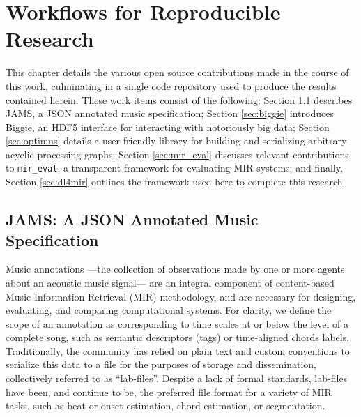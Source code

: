 

\graphicspath{{7/figures/}}

\chapter{Workflows for Reproducible Research}
\label{chp:reproducibility}

This chapter details the various open source contributions made in the course of this work, culminating in a single code repository used to produce the results contained herein.
These work items consist of the following:
Section \ref{sec:jams} describes JAMS, a JSON annotated music specification;
Section \ref{sec:biggie} introduces Biggie, an HDF5 interface for interacting with notoriously big data;
Section \ref{sec:optimus} details a user-friendly library for building and serializing arbitrary acyclic processing graphs;
Section \ref{sec:mir_eval} discusses relevant contributions to \texttt{mir\_eval}, a transparent framework for evaluating MIR systems;
and finally, Section \ref{sec:dl4mir} outlines the framework used here to complete this research.



\section{JAMS: A JSON Annotated Music Specification}
\label{sec:jams}

Music annotations ---the collection of observations made by one or more agents about an acoustic music signal--- are an integral component of content-based Music Information Retrieval (MIR) methodology, and are necessary for designing, evaluating, and comparing computational systems.
For clarity, we define the scope of an annotation as corresponding to time scales at or below the level of a complete song, such as semantic descriptors (tags) or time-aligned chords labels.
Traditionally, the community has relied on plain text and custom conventions to serialize this data to a file for the purposes of storage and dissemination, collectively referred to as ``lab-files''.
Despite a lack of formal standards, lab-files have been, and continue to be, the preferred file format for a variety of MIR tasks, such as beat or onset estimation, chord estimation, or segmentation.

